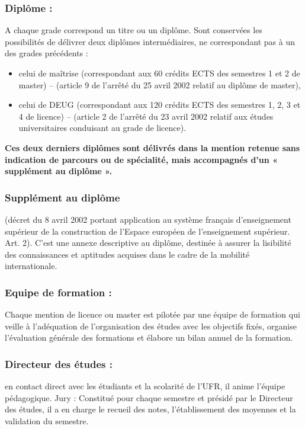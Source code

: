 \documentclass[10pt, a5paper]{report}
\begin{document}
\begin{spacing}{1.5}
\subsubsection*{Diplôme :}

A chaque grade correspond un titre ou un diplôme. Sont conservées les possibilités de délivrer deux diplômes intermédiaires, ne correspondant pas à un des grades précédents :
\begin{itemize}
\item celui de maîtrise (correspondant aux 60 crédits ECTS des semestres 1 et 2 de master) – (article 9 de l’arrêté du 25 avril 2002 relatif au diplôme de master),
\item celui de DEUG (correspondant aux 120 crédits ECTS des semestres 1, 2, 3 et 4 de licence) – (article 2 de l’arrêté du 23 avril 2002 relatif aux études universitaires conduisant au grade de licence).
\end{itemize}

\textbf{Ces deux derniers diplômes sont délivrés dans la mention retenue sans indication de parcours ou de spécialité, mais accompagnés d’un « supplément au diplôme ».}

\subsubsection*{Supplément au diplôme} 

(décret du 8 avril 2002 portant application au système français d’enseignement supérieur de la construction de l’Espace européen de l’enseignement supérieur. Art. 2). C’est une annexe descriptive au diplôme,  destinée à assurer la lisibilité des connaissances et aptitudes acquises dans le cadre de la mobilité internationale.

\subsubsection*{Equipe de formation :} Chaque mention de licence ou master est pilotée par une équipe de formation qui veille à l’adéquation de l’organisation des études avec les objectifs fixés, organise l’évaluation générale des formations et élabore  un bilan annuel de la formation.


\subsubsection*{Directeur des études :} en contact direct avec les étudiants et la scolarité de l’UFR, il anime l’équipe pédagogique.
Jury : Constitué pour chaque semestre et présidé par le Directeur des études, il a en charge le recueil des notes, l’établissement des moyennes et la validation du semestre.



\end{spacing}
\end{document}

